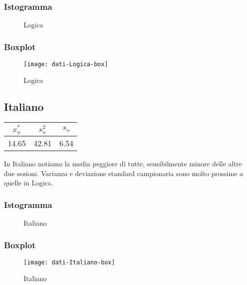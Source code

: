 \subsubsection{Istogramma}
\begin{figure}[!h]
  \caption{Logica}
\end{figure}

\subsubsection{Boxplot}
\begin{figure}[!h]
  \centering
  \texttt{[image: dati-Logica-box]}
  \caption{Logica}
\end{figure}
\restoregeometry
\clearpage

\thispagestyle{empty} %
\subsection{Italiano}

\begin{center}
\begin{tabular}{|c|c|c|}
  \hline
  \(x_{n}^{*}\) & \(s_n^2\) & \(s_n\) \\
  \hline
  14.65 & 42.81 & 6.54 \\
  \hline
\end{tabular}
\end{center}
In Italiano notiamo la media peggiore di tutte, sensibilmente minore delle altre due sezioni. Varianza e deviazione standard campionaria sono molto prossime a quelle in Logica.
\subsubsection{Istogramma}
\begin{figure}[!h]
  \caption{Italiano}
\end{figure}

\subsubsection{Boxplot}
\begin{figure}[!h]
  \centering
  \texttt{[image: dati-Italiano-box]}
  \caption{Italiano}
\end{figure}
\restoregeometry
\clearpage


